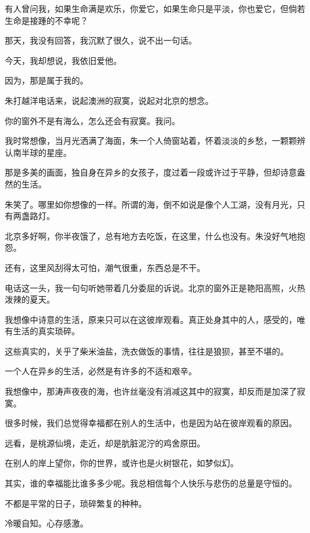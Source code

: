 		有人曾问我，如果生命满是欢乐，你爱它，如果生命只是平淡，你也爱它，但倘若生命是接踵的不幸呢？\par
		那天，我没有回答，我沉默了很久，说不出一句话。\par
		今天，我却想说，我依旧爱他。

		因为，那是属于我的。

	\endwriting



		朱打越洋电话来，说起澳洲的寂寞，说起对北京的想念。\par
		你的窗外不是有海么，怎么还会有寂寞。我问。\par
		我时常想像，当月光洒满了海面，朱一个人倚窗站着，怀着淡淡的乡愁，一颗颗辨认南半球的星座。\par
		那是多美的画面，独自身在异乡的女孩子，度过着一段或许过于平静，但却诗意盎然的生活。\par
		朱笑了。哪里如你想像的一样。所谓的海，倒不如说是像个人工湖，没有月光，只有两盏路灯。\par
		北京多好啊，你半夜饿了，总有地方去吃饭，在这里，什么也没有。朱没好气地抱怨。\par
		还有，这里风刮得太可怕，潮气很重，东西总是不干。\par
		电话这一头，我一句句听她带着几分委屈的诉说。北京的窗外正是艳阳高照，火热泼辣的夏天。\par
		我想像中诗意的生活，原来只可以在这彼岸观看。真正处身其中的人，感受的，唯有生活的真实琐碎。\par
		这些真实的，关乎了柴米油盐，洗衣做饭的事情，往往是狼狈，甚至不堪的。\par
		一个人在异乡的生活，必然是有许多的不适和艰辛。\par
		我想像中，那涛声夜夜的海，也许丝毫没有消减这其中的寂寞，却反而是加深了寂寞。\par
		很多时候，我们总觉得幸福都在别人的生活中，也是因为站在彼岸观看的原因。\par
		远看，是桃源仙境，走近，却是肮脏泥泞的鸡舍原田。\par
		在别人的岸上望你，你的世界，或许也是火树银花，如梦似幻。\par
		其实，谁的幸福能比谁多多少呢。我总相信每个人快乐与悲伤的总量是守恒的。\par
		不都是平常的日子，琐碎繁复的种种。

	\endwriting



		冷暖自知。心存感激。

